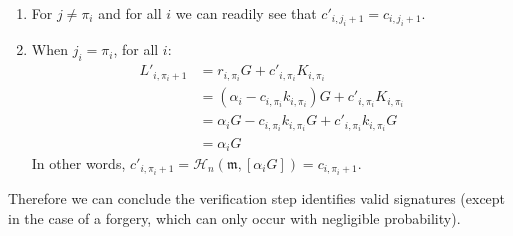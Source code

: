 \begin{enumerate}
	\item For \(j \ne \pi_i\) and for all \(i\) we can readily see that \(c'_{i, j_i+1} = c_{i, j_i+1}\).
	
	\item When \(j_i = \pi_i\), for all \(i \):
	\begin{align*}
	L'_{i, \pi_i+1} &= r_{i, \pi_i} G + c'_{i, \pi_i} K_{i, \pi_i} \\
	              &= (\alpha_i - c_{i, \pi_i} k_{i, \pi_i}) G + c'_{i, \pi_i} K_{i, \pi_i} \\
	              &= \alpha_i G - c_{i, \pi_{i}} k_{i, \pi_i} G + c'_{i, \pi_i} k_{i, \pi_i} G \\
	              &= \alpha_i G 
	\end{align*}
	In other words, \(c'_{i, \pi_i+1} = \mathcal{H}_n(\mathfrak{m}, [\alpha_i G]) = c_{i, \pi_i+1}\).
	
\end{enumerate}

Therefore we can conclude the verification step identifies valid signatures (except in the case of a forgery, which can only occur with negligible probability).

